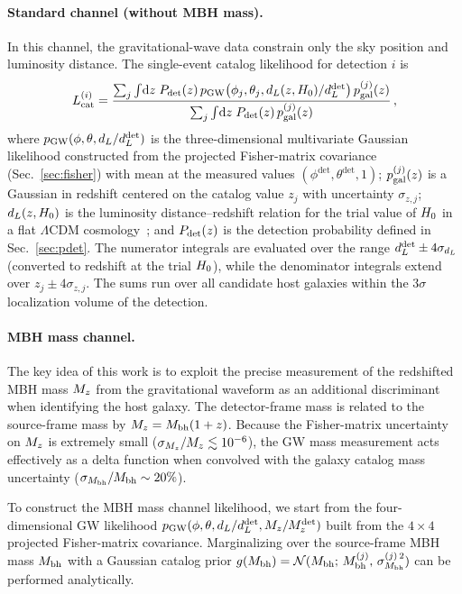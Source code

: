 \paragraph{Standard channel (without MBH mass).}
In this channel, the gravitational-wave data constrain only the sky
position and luminosity distance.  The single-event catalog likelihood for
detection $i$ is~\cite{Gray:2019ksv,Gair:2022zsa}
\begin{equation}
  \Lcat^{(i)} = \frac{%
    \sum_j \int \!\mathrm{d}z\;\pdet(z)\,
    \pGW\bigl(\phi_j, \theta_j, \dL(z, \HH)/\dL^\mathrm{det}\bigr)\,
    \pgal^{(j)}(z)
  }{%
    \sum_j \int \!\mathrm{d}z\;\pdet(z)\,\pgal^{(j)}(z)
  } \,,
  \label{eq:Lcat_no_mass}
\end{equation}
where $p_\mathrm{GW}(\phi, \theta, d_L/d_L^\mathrm{det})$ is the three-dimensional
multivariate Gaussian likelihood constructed from the projected Fisher-matrix
covariance (Sec.~\ref{sec:fisher}) with mean at the measured values
$(\phi^\mathrm{det}, \theta^\mathrm{det}, 1)$;
$p_\mathrm{gal}^{(j)}(z)$ is a Gaussian in redshift centered on the catalog value
$z_j$ with uncertainty $\sigma_{z,j}$;
$d_L(z, H_0)$ is the luminosity distance--redshift relation for the trial
value of $H_0$ in a flat $\Lambda$CDM cosmology~\cite{Hogg:1999ad};
and $P_\mathrm{det}(z)$ is the detection probability defined in
Sec.~\ref{sec:pdet}.
The numerator integrals are evaluated over the range
$d_L^\mathrm{det} \pm 4\sigma_{d_L}$ (converted to redshift at the trial
$H_0$), while the denominator integrals extend over
$z_j \pm 4\sigma_{z,j}$.
The sums run over all candidate host galaxies within the
$3\sigma$ localization volume of the detection.

\paragraph{MBH mass channel.}
The key idea of this work is to exploit the precise measurement of the
redshifted MBH mass $M_z$ from the gravitational waveform as an additional
discriminant when identifying the host galaxy.  The detector-frame mass
is related to the source-frame mass by $M_z = M_\mathrm{bh}(1+z)$.  Because the
Fisher-matrix uncertainty on $M_z$ is extremely small
($\sigma_{M_z}/M_z \lesssim 10^{-6}$), the GW mass measurement acts
effectively as a delta function when convolved with the galaxy catalog mass
uncertainty ($\sigma_{M_\mathrm{bh}}/M_\mathrm{bh} \sim 20\%$).

To construct the MBH mass channel likelihood, we start from the
four-dimensional GW likelihood $p_\mathrm{GW}(\phi, \theta, d_L/d_L^\mathrm{det},
M_z/M_z^\mathrm{det})$ built from the $4\times 4$ projected Fisher-matrix
covariance.  Marginalizing over the source-frame MBH mass $M_\mathrm{bh}$ with a
Gaussian catalog prior $g(M_\mathrm{bh}) = \mathcal{N}(M_\mathrm{bh};\, M_\mathrm{bh}^{(j)},\,
\sigma_{M_\mathrm{bh}}^{(j)\,2})$ can be performed analytically.

